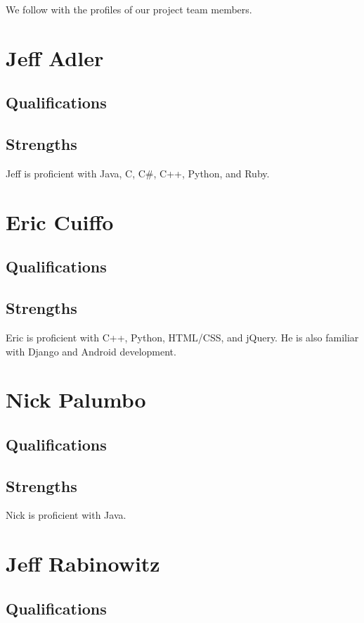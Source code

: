 \documentclass[11pt,letterpaper,oneside]{memoir}
\begin{document}
We follow with the profiles of our project team members.

\section{Jeff Adler}

\subsection{Qualifications}
\subsection{Strengths}
Jeff is proficient with Java, C, C\#, C++, Python, and Ruby. 

\section{Eric Cuiffo}

\subsection{Qualifications}
\subsection{Strengths}
Eric is proficient with C++, Python, HTML/CSS, and jQuery. He is also
familiar with Django and Android development.

\section{Nick Palumbo}

\subsection{Qualifications}
\subsection{Strengths}
Nick is proficient with Java.

\section{Jeff Rabinowitz}

\subsection{Qualifications}
\end{document}
